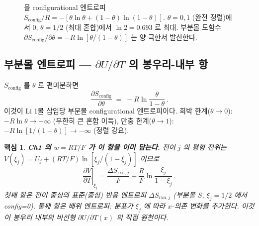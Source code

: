 \documentclass[11pt,a4paper]{article}
\newtheorem*{keybox}{핵심}
\newcommand{\rxn}{\mathrm{rxn}}
\newcommand{\config}{\mathrm{config}}
\begin{document}
\begin{figure}[h]
\centering
{}
\caption{몰 configurational 엔트로피 $S_\config/R=-[\theta\ln\theta+(1-\theta)\ln(1-\theta)]$.
  $\theta=0,1$ (완전 정렬)에서 0, $\theta=1/2$ (최대 혼합)에서 $\ln 2=0.693$ 로 최대.
  부분몰 도함수 $\partial S_\config/\partial\theta=-R\ln[\theta/(1-\theta)]$ 는 양 극한서 발산한다.}
\label{fig:Sconfig}
\end{figure}

\subsection{부분몰 엔트로피 — $\partial U/\partial T$ 의 봉우리-내부 항}

$S_\config$ 를 $\theta$ 로 편미분하면
\begin{equation}
  \frac{\partial S_\config}{\partial\theta}
  \;=\; -R\ln\frac{\theta}{1-\theta}\,.
  \label{eq:partial_Sconfig}
\end{equation}
이것이 Li 1몰 삽입당 부분몰 configurational 엔트로피이다.
희박 한계($\theta\to0$): $-R\ln\theta\to+\infty$ (무한히 큰 혼합 이득),
만충 한계($\theta\to1$): $-R\ln[1/(1-\theta)]\to-\infty$ (정렬 강요).

\begin{keybox}
\textbf{Ch1 의 $w=RT/F$ 가 이 항을 이미 담는다.}
전이 $j$ 의 평형 전위는 $V(\xi_j)=U_j+(RT/F)\ln[\xi_j/(1-\xi_j)]$ 이므로
\[
  \left.\frac{\partial V}{\partial T}\right|_{\xi_j}
  = \frac{\Delta S_{\rxn,j}}{F} + \frac{R}{F}\ln\frac{\xi_j}{1-\xi_j}\,.
\]
첫째 항은 전이 중심의 \emph{표준(중심) 반응 엔트로피} $\Delta S_{\rxn,j}$ (부분몰 $S$,
$\xi_j=1/2$ 에서 config=0). 둘째 항은 배위 엔트로피: 분포가 $\xi_j$ 에 따라
$x$-의존 변화를 추가한다. 이것이 봉우리 내부의 비선형 $\partial U/\partial T(x)$
의 직접 원천이다.
\end{keybox}
\end{document}
